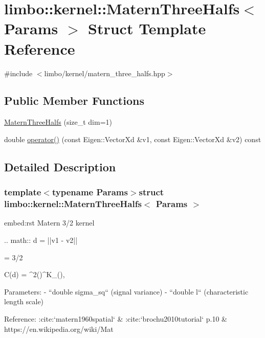 \hypertarget{structlimbo_1_1kernel_1_1_matern_three_halfs}{}\section{limbo\+:\+:kernel\+:\+:Matern\+Three\+Halfs$<$ Params $>$ Struct Template Reference}
\label{structlimbo_1_1kernel_1_1_matern_three_halfs}


{\ttfamily \#include $<$limbo/kernel/matern\+\_\+three\+\_\+halfs.\+hpp$>$}

\subsection*{Public Member Functions}
\begin{DoxyCompactItemize}
\item 
\hyperlink{structlimbo_1_1kernel_1_1_matern_three_halfs_a2f46e1fb1e7239e1f1dccd422dee576e}{Matern\+Three\+Halfs} (size\+\_\+t dim=1)
\item 
double \hyperlink{structlimbo_1_1kernel_1_1_matern_three_halfs_affe5c6971e6afe32881603b857958a83}{operator()} (const Eigen\+::\+Vector\+Xd \&v1, const Eigen\+::\+Vector\+Xd \&v2) const 
\end{DoxyCompactItemize}


\subsection{Detailed Description}
\subsubsection*{template$<$typename Params$>$struct limbo\+::kernel\+::\+Matern\+Three\+Halfs$<$ Params $>$}

\begin{DoxyVerb}embed:rst
 Matern 3/2 kernel

 .. math::
   d = ||v1 - v2||

   \nu = 3/2

   C(d) = \sigma^2\Bigg(\sqrt{2\nu}\Bigg)^\nu K_\nu\Bigg(\sqrt{2\nu}\Bigg),


 Parameters:
  - ``double sigma_sq`` (signal variance)
  - ``double l`` (characteristic length scale)

Reference: :cite:`matern1960spatial` & :cite:`brochu2010tutorial` p.10 & https://en.wikipedia.org/wiki/Mat%
\end{DoxyVerb}
 

